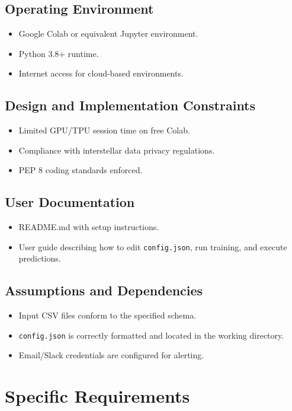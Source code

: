 \documentclass[15pt]{article}
\begin{document}
\subsection{Operating Environment}
\begin{itemize}
  \item Google Colab or equivalent Jupyter environment.
  \item Python 3.8+ runtime.
  \item Internet access for cloud-based environments.
\end{itemize}

\subsection{Design and Implementation Constraints}
\begin{itemize}
  \item Limited GPU/TPU session time on free Colab.
  \item Compliance with interstellar data privacy regulations.
  \item PEP 8 coding standards enforced.
\end{itemize}

\subsection{User Documentation}
\begin{itemize}
  \item README.md with setup instructions.
  \item User guide describing how to edit \texttt{config.json}, run training, and execute predictions.
\end{itemize}

\subsection{Assumptions and Dependencies}
\begin{itemize}
  \item Input CSV files conform to the specified schema.
  \item \texttt{config.json} is correctly formatted and located in the working directory.
  \item Email/Slack credentials are configured for alerting.
\end{itemize}

\section{Specific Requirements}
\end{document}
